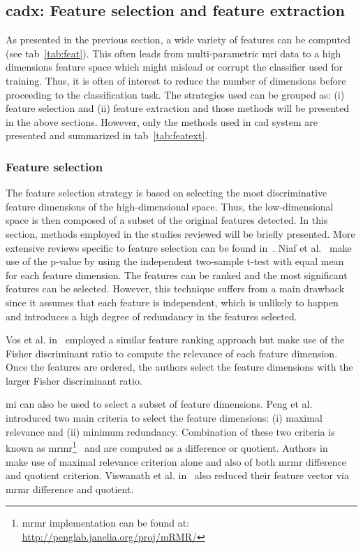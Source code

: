 \subsection{\ac{cadx}: Feature selection and feature extraction} \label{subsec:featureselectionextraction}

As presented in the previous section, a wide variety of features can be computed (see \ac{tab}~\ref{tab:feat}). This often leads from multi-parametric \ac{mri} data to a high dimensions feature space which might mislead or corrupt the classifier used for training. Thus, it is often of interest to reduce the number of dimensions before proceeding to the classification task. The strategies used can be grouped as: (i) feature selection and (ii) feature extraction and those methods will be presented in the above sections. However, only the methods used in \ac{cad} system are presented and summarized in \ac{tab}~\ref{tab:featext}.

\subsubsection{Feature selection}\label{subsubsec:featsel}

The feature selection strategy is based on selecting the most discriminative feature dimensions of the high-dimensional space. Thus, the low-dimensional space is then composed of a subset of the original features detected. In this section, methods employed in the studies reviewed will be briefly presented. More extensive reviews specific to feature selection can be found in~\cite{Saeys2007}.
Niaf et al.~\cite{Niaf2011,Niaf2012} make use of the p-value by using the independent two-sample t-test with equal mean for each feature dimension. The features can be ranked and the most significant features can be selected. However, this technique suffers from a main drawback since it assumes that each feature is independent, which is unlikely to happen and introduces a high degree of redundancy in the features selected.

Vos et al. in~\cite{Vos2012} employed a similar feature ranking approach but make use of the Fisher discriminant ratio to compute the relevance of each feature dimension. Once the features are ordered, the authors select the feature dimensions with the larger Fisher discriminant ratio.

\ac{mi} can also be used to select a subset of feature dimensions. Peng et al. introduced two main criteria to select the feature dimensions: (i) maximal relevance and (ii) minimum redundancy. Combination of these two criteria is known as \ac{mrmr}\footnote{\ac{mrmr} implementation can be found at: \url{http://penglab.janelia.org/proj/mRMR/}}~\cite{Peng2005} and are computed as a difference or quotient. Authors in~\cite{Niaf2011,Niaf2012} make use of maximal relevance criterion alone and also of both \ac{mrmr} difference and quotient criterion. Viswanath et al. in~\cite{Viswanath2012} also reduced their feature vector via \ac{mrmr} difference and quotient.

